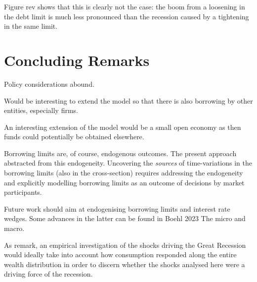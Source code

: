 \documentclass[12pt]{article} %
\numberwithin{equation}{section} %
\numberwithin{figure}{section}
\numberwithin{table}{section}
\begin{document}
Figure rev shows that this is clearly not the case: the boom from a loosening in the debt limit is much less pronounced than the recession caused by a tightening in the same limit.



\section{Concluding Remarks}
\label{sec:conclusion}

Policy considerations abound.

Would be interesting to extend the model so  that there is also borrowing by other entities, especially firms.

An interesting extension of the model would be a small open economy as then funds could potentially be obtained elsewhere.

Borrowing limits are, of course, endogenous outcomes. The present approach abstracted from this endogeneity. Uncovering the \textit{sources} of time-variations in the borrowing limits (also in the cross-section) requires addressing the endogeneity and explicitly modelling borrowing limits as an outcome of decisions by market participants.

Future work should aim at endogenising borrowing limits and interest rate wedges. Some advances in the latter can be found in Boehl 2023 The micro and macro.

As \textcite{kv2018} remark, an empirical investigation of the shocks driving the  Great Recession would ideally take into account how consumption responded along the entire wealth distribution in order to discern whether the shocks analysed here were a driving force of the recession.

\newpage
\thispagestyle{plain}
\printbibliography[heading=bibintoc] %
\end{document}
